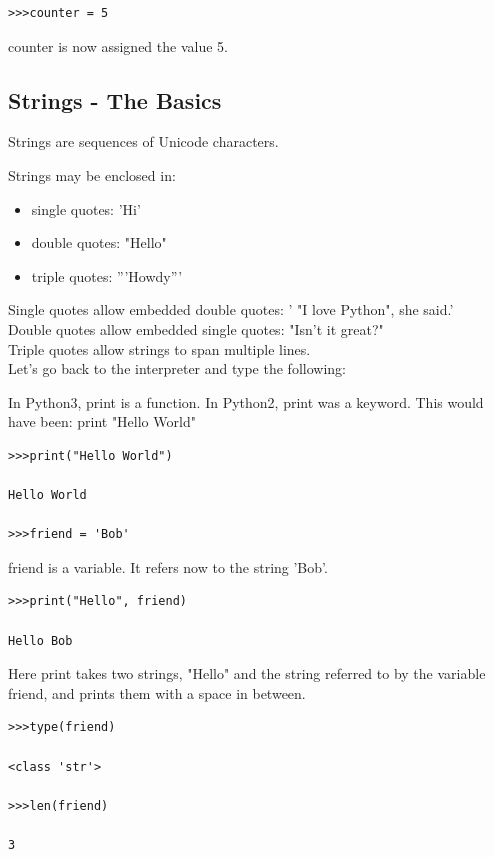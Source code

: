 \documentclass{article}
\begin{document}
\begin{lstlisting}
>>>counter = 5

\end{lstlisting}

counter is now assigned the value  5.  

\subsection{Strings - The Basics}

Strings are sequences of Unicode characters. 

Strings may be enclosed in:
\begin{itemize}

\item single quotes: 'Hi'
\item double quotes: "Hello"
\item triple quotes: '''Howdy'''
\end{itemize}

Single quotes allow embedded double quotes:  ' "I love Python", she said.'\\

Double quotes allow embedded single quotes:  "Isn't it great?"\\

Triple quotes allow strings to span multiple lines.\\

Let's go back to the interpreter and type the following:

In Python3, print is a function. In Python2, print was a keyword. This would have been: print "Hello World"
\begin{lstlisting}
>>>print("Hello World") 

Hello World

>>>friend = 'Bob' 
\end{lstlisting}

friend is a variable.  It refers now to the string 'Bob'.

\begin{lstlisting}
>>>print("Hello", friend)

Hello Bob
\end{lstlisting}

Here print takes two strings, "Hello" and the string referred to by the variable friend, and prints them with a space in between.
\begin{lstlisting}
>>>type(friend)

<class 'str'> 

>>>len(friend)

3
\end{lstlisting}
\end{document}
